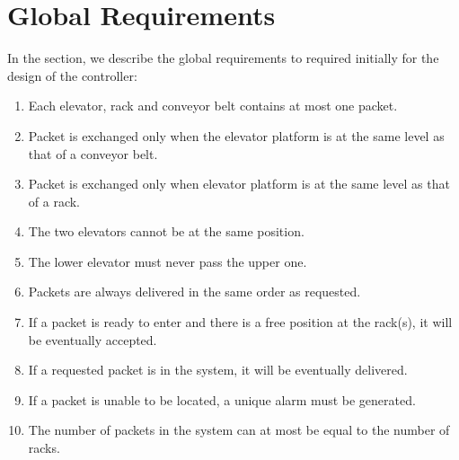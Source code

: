 \section*{Global Requirements}
In the section, we describe the global requirements to required initially for the design of the controller:\\
\begin{enumerate}
\item Each elevator, rack and conveyor belt contains at most one packet.
\item Packet is exchanged only when the elevator platform is at the same level as that of a conveyor belt.
\item Packet is exchanged only when elevator platform is at the same level as that of a rack.
\item The two elevators cannot be at the same position.
\item The lower elevator must never pass the upper one.
\item Packets are always delivered in the same order as requested.
\item If a packet is ready to enter and there is a free position at the rack(s), it will be eventually accepted.
\item If a requested packet is in the system, it will be eventually delivered.
\item If a packet is unable to be located, a unique alarm must be generated.
\item The number of packets in the system can at most be equal to the number of racks.


\end{enumerate}